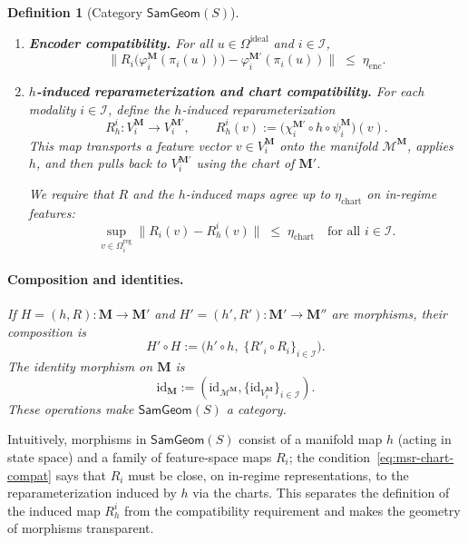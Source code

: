 \documentclass[11pt]{article}
\newtheorem{definition}{Definition}
\newcommand{\SamGeom}{\mathsf{SamGeom}}
\begin{document}
\begin{definition}[Category $\SamGeom(S)$]
\begin{enumerate}[]
\item \textbf{Encoder compatibility.} For all $u \in \Omega^{\mathrm{ideal}}$ and $i \in \mathcal{I}$,
\begin{equation}
\label{eq:msr-enc-compat}
\bigl\|
R_i\bigl(\varphi_i^{\mathbf{M}}(\pi_i(u))\bigr)
-
\varphi_i^{\mathbf{M}'}(\pi_i(u))
\bigr\|
\;\le\;
\eta_{\mathrm{enc}}.
\end{equation}

\item \textbf{$h$-induced reparameterization and chart compatibility.}
For each modality $i \in \mathcal{I}$, define the \emph{$h$-induced reparameterization}
\[
R_h^i : V_i^{\mathbf{M}} \to V_i^{\mathbf{M}'},
\qquad
R_h^i(v)
:=
\bigl(\chi_i^{\mathbf{M}'} \circ h \circ \psi_i^{\mathbf{M}}\bigr)(v).
\]
This map transports a feature vector $v \in V_i^{\mathbf{M}}$ onto the manifold
$\mathcal{M}^{\mathbf{M}}$, applies $h$, and then pulls back to $V_i^{\mathbf{M}'}$ using the chart
of $\mathbf{M}'$.

We require that $R$ and the $h$-induced maps agree up to $\eta_{\mathrm{chart}}$ on in-regime
features:
\begin{equation}
\label{eq:msr-chart-compat}
\sup_{v \in \Omega^{\mathrm{reg}}_i}
\bigl\|
R_i(v) - R_h^i(v)
\bigr\|
\;\le\;
\eta_{\mathrm{chart}}
\quad
\text{for all } i \in \mathcal{I}.
\end{equation}
\end{enumerate}

\paragraph{Composition and identities.}
If $H = (h, R) : \mathbf{M} \to \mathbf{M}'$ and
$H' = (h', R') : \mathbf{M}' \to \mathbf{M}''$ are morphisms, their composition is
\[
H' \circ H
:=
\bigl(h' \circ h,\; \{R'_i \circ R_i\}_{i\in\mathcal{I}}\bigr).
\]
The identity morphism on $\mathbf{M}$ is
\[
\mathrm{id}_{\mathbf{M}} := (\mathrm{id}_{\mathcal{M}^{\mathbf{M}}}, \{\mathrm{id}_{V_i^{\mathbf{M}}}\}_{i\in\mathcal{I}}).
\]
These operations make $\SamGeom(S)$ a category.
\end{definition}

Intuitively, morphisms in $\SamGeom(S)$ consist of a manifold map $h$ (acting in state space) and
a family of feature-space maps $R_i$; the condition~\eqref{eq:msr-chart-compat} says that $R_i$
must be close, on in-regime representations, to the reparameterization induced by $h$ via the charts.
This separates the definition of the induced map $R_h^i$ from the compatibility requirement and
makes the geometry of morphisms transparent.
\end{document}
